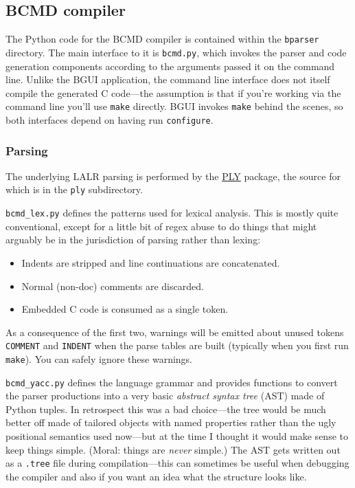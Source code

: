 \documentclass[a4paper,11pt]{article}
\begin{document}
\subsection{BCMD compiler}

The Python code for the BCMD compiler is contained within the \texttt{bparser} directory. The main interface to it is \texttt{bcmd.py}, which invokes the parser and code generation  components according to the arguments passed it on the command line. Unlike the BGUI application, the command line interface does not itself compile the generated C code---the assumption is that if you're working via the command line you'll use \texttt{make} directly. BGUI invokes \texttt{make} behind the scenes, so both interfaces depend on having run \texttt{configure}.



\subsubsection{Parsing}

The underlying LALR parsing is performed by the \href{http://www.dabeaz.com/ply/}{PLY} package, the source for which is in the \texttt{ply} subdirectory.

\texttt{bcmd\_lex.py} defines the patterns used for lexical analysis. This is mostly quite conventional, except for a little bit of regex abuse to do things that might arguably be in the jurisdiction of parsing rather than lexing:
\begin{itemize}
\item Indents are stripped and line continuations are concatenated.
\item Normal (non-doc) comments are discarded.
\item Embedded C code is consumed as a single token.
\end{itemize}
As a consequence of the first two, warnings will be emitted about unused tokens \texttt{COMMENT} and \texttt{INDENT} when the parse tables are built (typically when you first run \texttt{make}). You can safely ignore these warnings.

\texttt{bcmd\_yacc.py} defines the language grammar and provides functions to convert the parser productions into a very basic \textit{abstract syntax tree} (AST) made of Python tuples. In retrospect this was a bad choice---the tree would be much better off made of tailored objects with named properties rather than the ugly positional semantics used now---but at the time I thought it would make sense to keep things simple. (Moral: things are \textit{never} simple.) The AST gets written out as a \texttt{.tree} file during compilation---this can sometimes be useful when debugging the compiler and also if you want an idea what the structure looks like.
\end{document}
